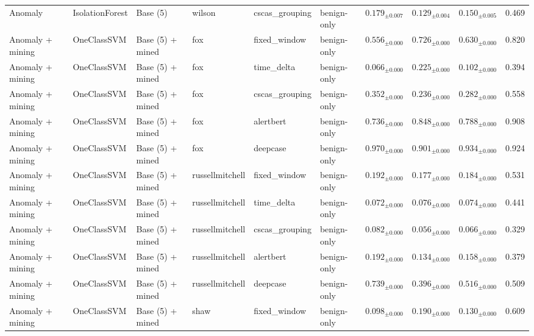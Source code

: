\begin{longtable}{llllllcccc}
\addlinespace
Anomaly & IsolationForest & Base (5) & wilson & cscas\_grouping & benign-only & $0.179_{\pm 0.007}$ & $0.129_{\pm 0.004}$ & $0.150_{\pm 0.005}$ & 0.469 \\
\addlinespace
Anomaly + mining & OneClassSVM & Base (5) + mined & fox & fixed\_window & benign-only & $0.556_{\pm 0.000}$ & $0.726_{\pm 0.000}$ & $0.630_{\pm 0.000}$ & 0.820 \\
\addlinespace
Anomaly + mining & OneClassSVM & Base (5) + mined & fox & time\_delta & benign-only & $0.066_{\pm 0.000}$ & $0.225_{\pm 0.000}$ & $0.102_{\pm 0.000}$ & 0.394 \\
\addlinespace
Anomaly + mining & OneClassSVM & Base (5) + mined & fox & cscas\_grouping & benign-only & $0.352_{\pm 0.000}$ & $0.236_{\pm 0.000}$ & $0.282_{\pm 0.000}$ & 0.558 \\
\addlinespace
Anomaly + mining & OneClassSVM & Base (5) + mined & fox & alertbert & benign-only & $0.736_{\pm 0.000}$ & $0.848_{\pm 0.000}$ & $0.788_{\pm 0.000}$ & 0.908 \\
\addlinespace
Anomaly + mining & OneClassSVM & Base (5) + mined & fox & deepcase & benign-only & $0.970_{\pm 0.000}$ & $0.901_{\pm 0.000}$ & $0.934_{\pm 0.000}$ & 0.924 \\
\addlinespace
Anomaly + mining & OneClassSVM & Base (5) + mined & russellmitchell & fixed\_window & benign-only & $0.192_{\pm 0.000}$ & $0.177_{\pm 0.000}$ & $0.184_{\pm 0.000}$ & 0.531 \\
\addlinespace
Anomaly + mining & OneClassSVM & Base (5) + mined & russellmitchell & time\_delta & benign-only & $0.072_{\pm 0.000}$ & $0.076_{\pm 0.000}$ & $0.074_{\pm 0.000}$ & 0.441 \\
\addlinespace
Anomaly + mining & OneClassSVM & Base (5) + mined & russellmitchell & cscas\_grouping & benign-only & $0.082_{\pm 0.000}$ & $0.056_{\pm 0.000}$ & $0.066_{\pm 0.000}$ & 0.329 \\
\addlinespace
Anomaly + mining & OneClassSVM & Base (5) + mined & russellmitchell & alertbert & benign-only & $0.192_{\pm 0.000}$ & $0.134_{\pm 0.000}$ & $0.158_{\pm 0.000}$ & 0.379 \\
\addlinespace
Anomaly + mining & OneClassSVM & Base (5) + mined & russellmitchell & deepcase & benign-only & $0.739_{\pm 0.000}$ & $0.396_{\pm 0.000}$ & $0.516_{\pm 0.000}$ & 0.509 \\
\addlinespace
Anomaly + mining & OneClassSVM & Base (5) + mined & shaw & fixed\_window & benign-only & $0.098_{\pm 0.000}$ & $0.190_{\pm 0.000}$ & $0.130_{\pm 0.000}$ & 0.609 \\

\end{longtable}
